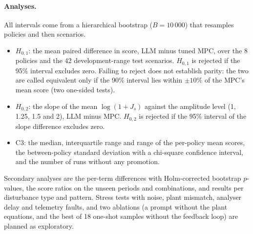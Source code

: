 \paragraph{Analyses.} All intervals come from a hierarchical bootstrap
($B = 10\,000$) that resamples policies and then scenarios.
\begin{itemize}
\item $H_{0,1}$: the mean paired difference in score, LLM minus tuned MPC,
  over the 8 policies and the 42 development-range test scenarios. $H_{0,1}$
  is rejected if the 95\% interval excludes zero. Failing to reject does not
  establish parity: the two are called equivalent only if the 90\% interval
  lies within $\pm 10\%$ of the MPC's mean score (two one-sided tests).
\item $H_{0,2}$: the slope of the mean $\log(1 + J_s)$ against the amplitude
  level (1, 1.25, 1.5 and 2), LLM minus MPC. $H_{0,2}$ is rejected if the
  95\% interval of the slope difference excludes zero.
\item C3: the median, interquartile range and range of the per-policy mean
  scores, the between-policy standard deviation with a chi-square
  confidence interval, and the number of runs without any promotion.
\end{itemize}
Secondary analyses are the per-term differences with Holm-corrected
bootstrap $p$-values, the score ratios on the unseen periods and
combinations, and results per disturbance type and pattern. Stress tests
with noise, plant mismatch, analyser delay and telemetry faults, and two
ablations (a prompt without the plant equations, and the best of 18 one-shot
samples without the feedback loop) are planned as exploratory.
